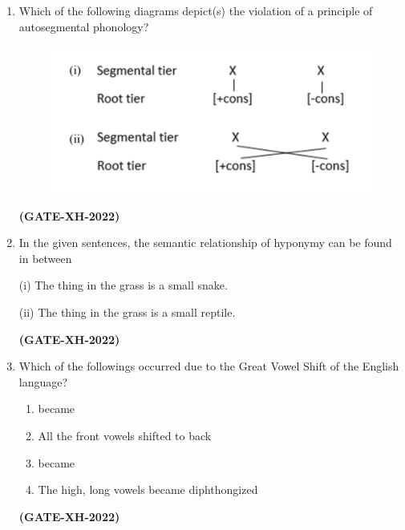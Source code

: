 \documentclass[journal]{IEEEtran}
\begin{document}
\begin{enumerate}
\item Which of the following diagrams depict(s) the violation of a principle of autosegmental phonology?
\begin{figure}[h!]
\centering
\includegraphics[width=0.5\columnwidth]{figs/Q.111.jpeg}
\label{Q.111}
\end{figure}
\begin{enumerate}
\end{enumerate}
\hfill\textbf{(GATE-XH-2022)}

\item In the given sentences, the semantic relationship of hyponymy can be found in between

(i) The thing in the grass is a small snake.

(ii) The thing in the grass is a small reptile.
\begin{enumerate}
\end{enumerate}
\hfill\textbf{(GATE-XH-2022)}

\item Which of the followings occurred due to the Great Vowel Shift of the English language?
\begin{enumerate}
\item \textipa{[a:]} became \textipa{[u:]}
\item All the front vowels shifted to back
\item \textipa{[ge:s]} became \textipa{[gi:s]}
\item The high, long vowels became diphthongized
\end{enumerate}
\hfill\textbf{(GATE-XH-2022)}


\end{enumerate}
\end{document}
